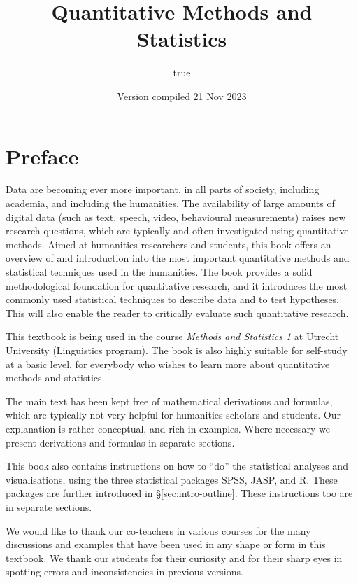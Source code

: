 \documentclass[
]{book}
\title{Quantitative Methods and Statistics}
\author{true}
\date{Version compiled 21 Nov 2023}
\begin{document}
\maketitle

{
\setcounter{tocdepth}{1}
\tableofcontents
}
\hypertarget{preface}{%
\chapter*{Preface}\label{preface}}

Data are becoming ever more important, in all parts of society, including academia, and including the humanities. The availability of large amounts of digital data (such as text, speech, video, behavioural measurements) raises new research questions, which are typically and often investigated using quantitative methods.
Aimed at humanities researchers and students, this book offers an overview of and introduction into the most important quantitative methods and statistical techniques used in the humanities. The book provides a solid methodological foundation for quantitative research, and it introduces the most commonly used statistical techniques to describe data and to test hypotheses. This will also enable the reader to critically evaluate such quantitative research.

This textbook is being used in the course \emph{Methods and Statistics 1} at Utrecht University (Linguistics program). The book is also highly suitable for self-study at a basic level, for everybody who wishes to learn more about quantitative methods and statistics.

The main text has been kept free of mathematical derivations and formulas, which are typically not very helpful for humanities scholars and students. Our explanation is rather conceptual, and rich in examples. Where necessary we present derivations and formulas in separate sections.

This book also contains instructions on how to ``do'' the statistical analyses and visualisations, using the three statistical packages SPSS, JASP, and R. These packages are further introduced in §\ref{sec:intro-outline}. These instructions too are in separate sections.

We would like to thank our co-teachers in various courses for the many discussions and examples that have been used in any shape or form in this textbook. We thank our students for their curiosity and for their sharp eyes in spotting errors and inconsistencies in previous versions.
\end{document}
